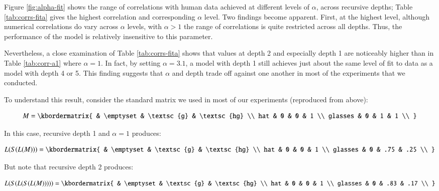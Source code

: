 \documentclass[man,noapacite]{apa2}
\begin{document}
Figure \ref{fig:alpha-fit} shows the range of correlations with human data achieved at different levels of $\alpha$, across recursive depths; Table \ref{tab:corrs-fita} gives the highest correlation and corresponding $\alpha$ level. Two findings become apparent. First, at the highest level, although numerical correlations do vary across $\alpha$ levels, with $\alpha > 1$ the range of correlations is quite restricted across all depths. Thus, the performance of the model is relatively insensitive to this parameter.

Nevertheless, a close examination of Table \ref{tab:corrs-fita} shows that values at depth 2 and especially depth 1 are noticeably higher than in Table \ref{tab:corr-a1} where $\alpha=1$. In fact, by setting $\alpha=3.1$, a model with depth 1 still achieves just about the same level of fit to data as a model with depth 4 or 5. This finding suggests that $\alpha$ and depth trade off against one another in most of the experiments that we conducted.

To understand this result, consider the standard matrix we used in most of our experiments (reproduced from above):

\begin{equation}
      M = \kbordermatrix{
                 & \emptyset & \textsc{g} & \textsc{hg} \\
        hat      & 0  & 0  & 1  \\
        glasses  & 0  & 1  & 1 \\
      }
\end{equation}

\noindent In this case, recursive depth 1 and $\alpha=1$ produces:

\begin{equation}
      L(S(L(M))) = \kbordermatrix{
                 & \emptyset & \textsc{g} & \textsc{hg} \\
        hat      & 0  & 0  & 1  \\
        glasses  & 0  & .75  & .25 \\
      }
\end{equation}



\noindent But note that recursive depth 2 produces:

\begin{equation}
  L(S(L(S(L(M))))) = \kbordermatrix{
             & \emptyset & \textsc{g} & \textsc{hg} \\
    hat      & 0  & 0  & 1  \\
    glasses  & 0  & .83  & .17 \\
  }
\end{equation}
\end{document}
